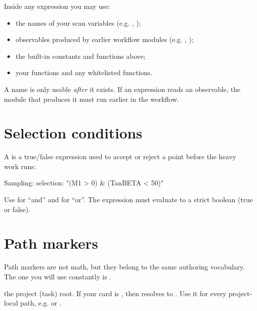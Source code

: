 Inside any expression you may use:

\begin{itemize}
  \item the names of your scan variables (e.g. , );
  \item observables produced by earlier workflow modules (e.g. , );
  \item the built-in constants and functions above;
  \item your  functions and any whitelisted  functions.
\end{itemize}

\begin{jwarn}
A name is only usable \emph{after} it exists. If an expression reads an observable, the module
that produces it must run earlier in the workflow.
\end{jwarn}

\section{Selection conditions}
\label{sec:expr-selection}

A  is a true/false expression used to accept or reject a point before the
heavy work runs:

\begin{yamlwin}
Sampling:
  selection: "(M1 > 0) & (TanBETA < 50)"
\end{yamlwin}

\noindent Use \code{\&} for ``and'' and \code{|} for ``or''. The expression must evaluate to a
strict boolean (true or false).

\section{Path markers}
\label{sec:expr-markers}

Path markers are not math, but they belong to the same authoring vocabulary. The one you will use
constantly is .

\begin{description}[style=nextline, leftmargin=1.2em]
  \item[\marker{\&J}] the project (task) root. If your card is , then
         resolves to . Use it for every project-local path, e.g.
         or .
\end{description}

